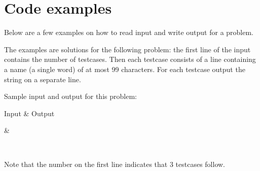 \documentclass[a4paper,10pt,english,openany]{sphinxmanual}
\begin{document}
\section{Code examples}
\label{\detokenize{team:code-examples}}\label{\detokenize{team:codeexamples}}
\sphinxAtStartPar
Below are a few examples on how to read input and write output for a
problem.

\sphinxAtStartPar
The examples are solutions for the following problem: the first line
of the input contains the number of testcases. Then each testcase
consists of a line containing a name (a single word) of at most 99
characters. For each testcase output the string 
on a separate line.

\sphinxAtStartPar
Sample input and output for this problem:


\begin{savenotes}\sphinxattablestart
\sphinxthistablewithglobalstyle
\centering
\begin{tabular}[t]{*{2}{}}
\sphinxtoprule
\sphinxstyletheadfamily 
\sphinxAtStartPar
Input
&\sphinxstyletheadfamily 
\sphinxAtStartPar
Output
\\
\sphinxmidrule
\sphinxtableatstartofbodyhook
\begin{DUlineblock}{0em}
\item[] 
\item[] 
\item[] 
\item[] 
\end{DUlineblock}
&
\begin{DUlineblock}{0em}
\item[] 
\item[] 
\item[] 
\end{DUlineblock}
\\
\sphinxbottomrule
\end{tabular}
\sphinxtableafterendhook\par
\sphinxattableend\end{savenotes}

\sphinxAtStartPar
Note that the number  on the first line indicates that 3 testcases
follow.
\end{document}
